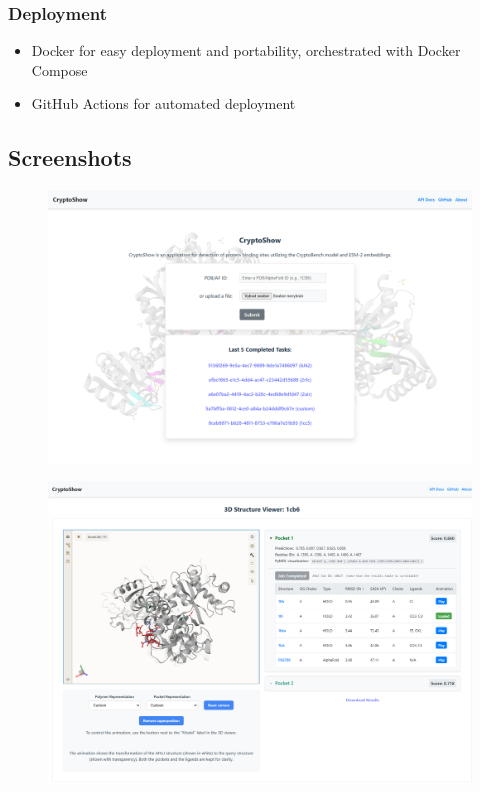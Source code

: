 \documentclass[aspectratio=169]{beamer}
\begin{document}
\begin{frame}
  \frametitle{Deployment}

  \begin{itemize}
    \item Docker for easy deployment and portability, orchestrated with Docker Compose
    \item GitHub Actions for automated deployment
  \end{itemize}

\end{frame}

\subsection{Screenshots}

\begin{frame}
  \begin{figure}
    \centering
    \includegraphics[width=\linewidth,height=\textheight,keepaspectratio]{fig/screen1.png}
  \end{figure}

\end{frame}

\begin{frame}
  \begin{figure}
    \centering
    \includegraphics[width=\linewidth,height=\textheight,keepaspectratio]{fig/screen2.png}
  \end{figure}

\end{frame}
\end{document}
